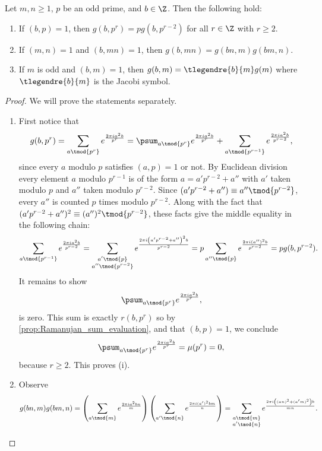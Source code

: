       \begin{proposition}\label{prop:quadratic_Gauss_sum_reduction}
        Let $m,n \ge 1$, $p$ be an odd prime, and $b \in \Z$. Then the following hold:
        \begin{enumerate}[label=(\roman*)]
          \item If $(b,p) = 1$, then $g(b,p^{r}) = pg(b,p^{r-2})$ for all $r \in \Z$ with $r \ge 2$.
          \item If $(m,n) = 1$ and $(b,mn) = 1$, then $g(b,mn) = g(bn,m)g(bm,n)$.
          \item If $m$ is odd and $(b,m) = 1$, then $g(b,m) = \tlegendre{b}{m}g(m)$ where $\tlegendre{b}{m}$ is the Jacobi symbol.
        \end{enumerate}
      \end{proposition}
      \begin{proof}
        We will prove the statements separately.
        \begin{enumerate}[label=(\roman*)]
          \item First notice that
          \[
            g(b,p^{r}) = \sum_{a \tmod{p^{r}}}e^{\frac{2\pi ia^{2}b}{p^{r}}} = \psum_{a \tmod{p^{r}}}e^{\frac{2\pi ia^{2}b}{p^{r}}}+\sum_{a \tmod{p^{r-1}}}e^{\frac{2\pi ia^{2}b}{p^{r-2}}},
          \]
          since every $a$ modulo $p$ satisfies $(a,p) = 1$ or not. By Euclidean division every element $a$ modulo $p^{r-1}$ is of the form $a = a'p^{r-2}+a''$ with $a'$ taken modulo $p$ and $a''$ taken modulo $p^{r-2}$. Since $(a'p^{r-2}+a'') \equiv a'' \tmod{p^{r-2}}$, every $a''$ is counted $p$ times modulo $p^{r-2}$. Along with the fact that $(a'p^{r-2}+a'')^{2} \equiv (a'')^{2} \tmod{p^{r-2}}$, these facts give the middle equality in the following chain:
          \[
            \sum_{a \tmod{p^{r-1}}}e^{\frac{2\pi ia^{2}b}{p^{r-2}}} = \sum_{\substack{a' \tmod{p} \\ a'' \tmod{p^{r-2}}}}e^{\frac{2\pi i\left(a'p^{r-2}+a''\right)^{2}b}{p^{r-2}}} = p\sum_{a'' \tmod{p}}e^{\frac{2\pi i(a'')^{2}b}{p^{r-2}}} = pg(b,p^{r-2}).
          \]
          It remains to show
          \[
            \psum_{a \tmod{p^{r}}}e^{\frac{2\pi ia^{2}b}{p^{r}}},
          \]
          is zero. This sum is exactly $r(b,p^{r})$ so by \cref{prop:Ramanujan_sum_evaluation}, and that $(b,p) = 1$, we conclude
          \[
            \psum_{a \tmod{p^{r}}}e^{\frac{2\pi ia^{2}b}{p^{r}}} = \mu(p^{r}) = 0,
          \]
          because $r \ge 2$. This proves (i).
          \item Observe
            \[
              g(bn,m)g(bm,n) = \left(\sum_{a \tmod{m}}e^{\frac{2\pi ia^{2}bn}{m}}\right)\left(\sum_{a' \tmod{n}}e^{\frac{2\pi i(a')^{2}bm}{n}}\right) = \sum_{\substack{a \tmod{m} \\ a' \tmod{n}}}e^{\frac{2\pi i\left((an)^{2}+(a'm)^{2}\right)b}{mn}}.
\]
\end{enumerate}
\end{proof}
